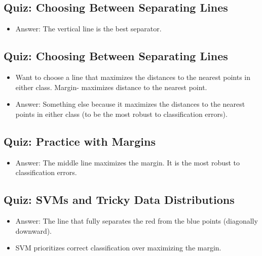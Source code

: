\documentclass[12pt]{report}
\begin{document}
\subsection{Quiz: Choosing Between Separating Lines}

\begin{itemize} 

\item Answer: The vertical line is the best separator.

\end{itemize}


\subsection{Quiz: Choosing Between Separating Lines}

\begin{itemize} 

\item Want to choose a line that maximizes the distances to the nearest points in either class. Margin- maximizes distance to the nearest point.  

\item Answer: Something else because it maximizes the distances to the nearest points in either class (to be the most robust to classification errors). 

\end{itemize}

\subsection{Quiz: Practice with Margins}

\begin{itemize} 

\item Answer: The middle line maximizes the margin. It is the most robust to classification errors. 

\end{itemize}

\subsection{Quiz: SVMs and Tricky Data Distributions}

\begin{itemize} 

\item Answer: The line that fully separates the red from the blue points (diagonally downward). 

\item SVM prioritizes correct classification over maximizing the margin. 

\end{itemize}
\end{document}
